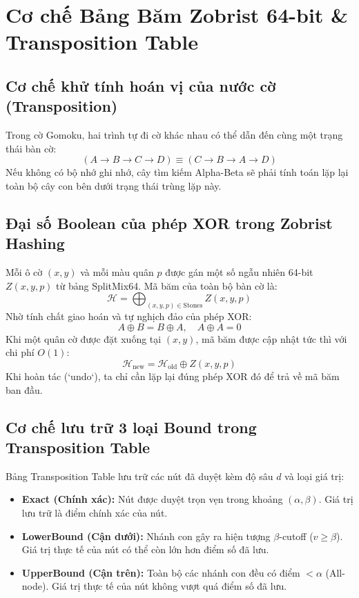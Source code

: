 \documentclass[11pt,a4paper]{report}
\begin{document}
\section{Cơ chế Bảng Băm Zobrist 64-bit \& Transposition Table}

\subsection{Cơ chế khử tính hoán vị của nước cờ (Transposition)}
Trong cờ Gomoku, hai trình tự đi cờ khác nhau có thể dẫn đến cùng một trạng thái bàn cờ:
\begin{equation}
    (A \to B \to C \to D) \equiv (C \to B \to A \to D)
\end{equation}
Nếu không có bộ nhớ ghi nhớ, cây tìm kiếm Alpha-Beta sẽ phải tính toán lặp lại toàn bộ cây con bên dưới trạng thái trùng lặp này.

\subsection{Đại số Boolean của phép XOR trong Zobrist Hashing}
Mỗi ô cờ $(x, y)$ và mỗi màu quân $p$ được gán một số ngẫu nhiên 64-bit $Z(x, y, p)$ từ bảng SplitMix64. Mã băm của toàn bộ bàn cờ là:
\begin{equation}
    \mathcal{H} = \bigoplus_{(x, y, p) \in \text{Stones}} Z(x, y, p)
\end{equation}
Nhờ tính chất giao hoán và tự nghịch đảo của phép XOR:
\begin{equation}
    A \oplus B = B \oplus A, \quad A \oplus A = 0
\end{equation}
Khi một quân cờ được đặt xuống tại $(x, y)$, mã băm được cập nhật tức thì với chi phí $O(1)$:
\begin{equation}
    \mathcal{H}_{\text{new}} = \mathcal{H}_{\text{old}} \oplus Z(x, y, p)
\end{equation}
Khi hoàn tác (`undo`), ta chỉ cần lặp lại đúng phép XOR đó để trả về mã băm ban đầu.

\subsection{Cơ chế lưu trữ 3 loại Bound trong Transposition Table}
Bảng Transposition Table lưu trữ các nút đã duyệt kèm độ sâu $d$ và loại giá trị:
\begin{itemize}
    \item \textbf{Exact (Chính xác):} Nút được duyệt trọn vẹn trong khoảng $(\alpha, \beta)$. Giá trị lưu trữ là điểm chính xác của nút.
    \item \textbf{LowerBound (Cận dưới):} Nhánh con gây ra hiện tượng $\beta$-cutoff ($v \ge \beta$). Giá trị thực tế của nút có thể còn lớn hơn điểm số đã lưu.
    \item \textbf{UpperBound (Cận trên):} Toàn bộ các nhánh con đều có điểm $< \alpha$ (All-node). Giá trị thực tế của nút không vượt quá điểm số đã lưu.
\end{itemize}
\end{document}
